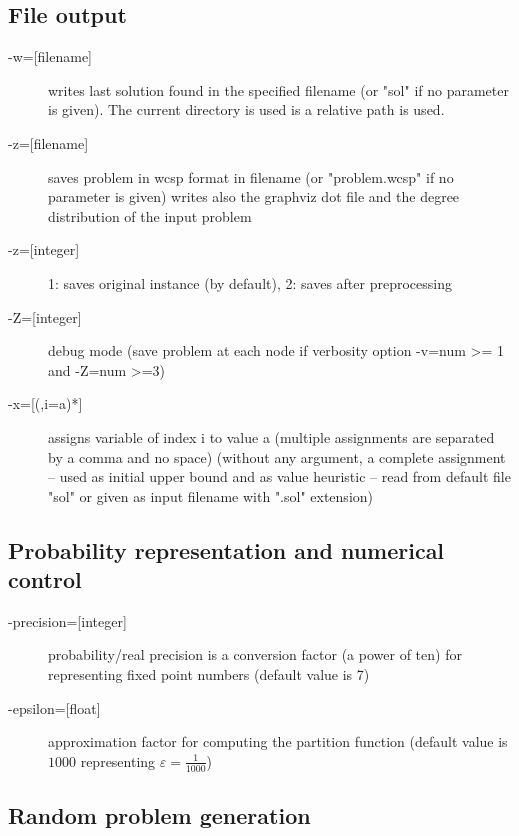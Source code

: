 \documentclass{article}
\begin{document}
\subsection{File output}

\begin{description}
\item[{-w=[filename]}] writes last solution found in the specified
  filename (or "sol" if no parameter is given). The current directory
  is used is a relative path is used.
\item[{-z=[filename]}]  saves problem in wcsp format in filename (or
  "problem.wcsp" if no parameter is given) writes also the graphviz
  dot file and the degree distribution of the input problem
\item[{-z=[integer]}] 1: saves original instance (by default), 2: saves
  after preprocessing
\item[{-Z=[integer]}] debug mode (save problem at each node if verbosity
  option -v=num >= 1 and -Z=num >=3)
\item[{-x=[(,i=a)*]}] assigns variable of index i to value a (multiple
  assignments are separated by a comma and no space) (without any
  argument, a complete assignment -- used as initial upper bound and
  as value heuristic -- read from default file "sol" or given as input
  filename with ".sol" extension)
\end{description}

\subsection{Probability representation and numerical control}

\begin{description}
\item[{-precision=[integer]}] probability/real precision is a conversion
  factor (a power of ten) for representing fixed point numbers
  (default value is 7)
\item[{-epsilon=[float]}] approximation factor for computing the partition
  function (default value is $1000$ representing
  $\varepsilon=\frac{1}{1000}$)
\end{description}
 
\subsection{Random problem generation}
\end{document}
